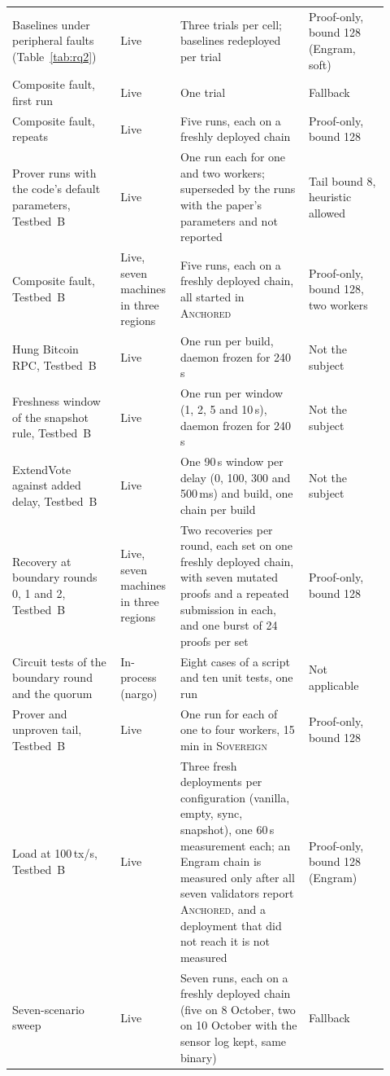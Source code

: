 {\begin{longtable}{@{}>{\raggedright\arraybackslash}p{0.27\linewidth}>{\raggedright\arraybackslash}p{0.13\linewidth}>{\raggedright\arraybackslash}p{0.32\linewidth}>{\raggedright\arraybackslash}p{0.20\linewidth}@{}}
Baselines under peripheral faults (Table~\ref{tab:rq2}) & Live & Three trials per cell; baselines redeployed per trial & Proof-only, bound 128 (Engram, soft) \\
Composite fault, first run & Live & One trial & Fallback \\
Composite fault, repeats & Live & Five runs, each on a freshly deployed chain & Proof-only, bound 128 \\
Prover runs with the code's default parameters, Testbed~B & Live & One run each for one and two workers; superseded by the runs with the paper's parameters and not reported & Tail bound 8, heuristic allowed \\
Composite fault, Testbed~B & Live, seven machines in three regions & Five runs, each on a freshly deployed chain, all started in \textsc{Anchored} & Proof-only, bound 128, two workers \\
Hung Bitcoin RPC, Testbed~B & Live & One run per build, daemon frozen for 240\,s & Not the subject \\
Freshness window of the snapshot rule, Testbed~B & Live & One run per window (1, 2, 5 and 10\,s), daemon frozen for 240\,s & Not the subject \\
ExtendVote against added delay, Testbed~B & Live & One 90\,s window per delay (0, 100, 300 and 500\,ms) and build, one chain per build & Not the subject \\
Recovery at boundary rounds 0, 1 and 2, Testbed~B & Live, seven machines in three regions & Two recoveries per round, each set on one freshly deployed chain, with seven mutated proofs and a repeated submission in each, and one burst of 24 proofs per set & Proof-only, bound 128 \\
Circuit tests of the boundary round and the quorum & In-process (nargo) & Eight cases of a script and ten unit tests, one run & Not applicable \\
Prover and unproven tail, Testbed~B & Live & One run for each of one to four workers, 15\,min in \textsc{Sovereign} & Proof-only, bound 128 \\
Load at 100\,tx/s, Testbed~B & Live & Three fresh deployments per configuration (vanilla, empty, sync, snapshot), one 60\,s measurement each; an Engram chain is measured only after all seven validators report \textsc{Anchored}, and a deployment that did not reach it is not measured & Proof-only, bound 128 (Engram) \\
Seven-scenario sweep & Live & Seven runs, each on a freshly deployed chain (five on 8 October, two on 10 October with the sensor log kept, same binary) & Fallback \\

\end{longtable}}
